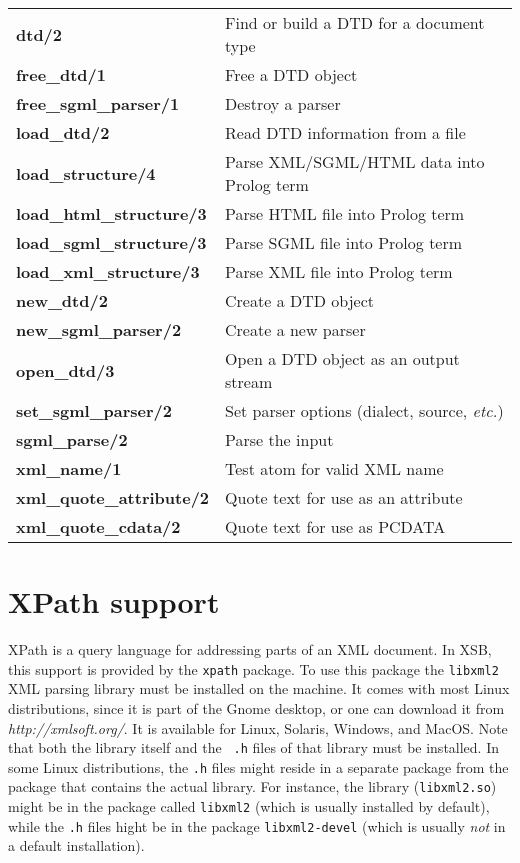 \begin{longtable}[l]{ll}
  {\bf dtd/2}&Find or build a DTD for a document type\\
  {\bf free\_dtd/1}&Free a DTD object\\
  {\bf free\_sgml\_parser/1}&Destroy a parser\\
  {\bf load\_dtd/2}&Read DTD information from a file\\
  {\bf load\_structure/4}&Parse XML/SGML/HTML data into Prolog term\\
  {\bf load\_html\_structure/3}&Parse HTML file into Prolog term\\
  {\bf load\_sgml\_structure/3}&Parse SGML file into Prolog term \\
  {\bf load\_xml\_structure/3}&Parse XML file into Prolog term\\
  {\bf new\_dtd/2}&Create a DTD object\\
  {\bf new\_sgml\_parser/2}&Create a new parser\\
  {\bf open\_dtd/3}&Open a DTD object as an output stream\\
  {\bf set\_sgml\_parser/2}&Set parser options (dialect, source, \emph{etc.})\\
  {\bf sgml\_parse/2}&Parse the input\\
  {\bf xml\_name/1}&Test atom for valid XML name\\
  {\bf xml\_quote\_attribute/2}&Quote text for use as an attribute\\
  {\bf xml\_quote\_cdata/2}&Quote text for use as PCDATA\\

\end{longtable}


\section{XPath support}\label{sec-xpath}

XPath is a query language for addressing parts of an XML document.
In XSB, this support is provided by the {\tt xpath} package.
To use this package the {\tt libxml2} XML parsing library must be installed
on the machine. It comes with most Linux distributions, since it is part of
the Gnome desktop, or one can download
it from \emph{http://xmlsoft.org/}. It is available for Linux, Solaris,
Windows, and MacOS. Note that both the library itself and the {\tt
  .h} files of that library must be installed. In some Linux distributions,
the {\tt .h} files might reside in a separate package
from the package that contains the actual library. For instance, the
library ({\tt libxml2.so})  might be in the package called {\tt libxml2}
(which is usually installed by default),
while the {\tt .h} files hight be in the package {\tt libxml2-devel}
(which is usually \emph{not} in a default installation).

